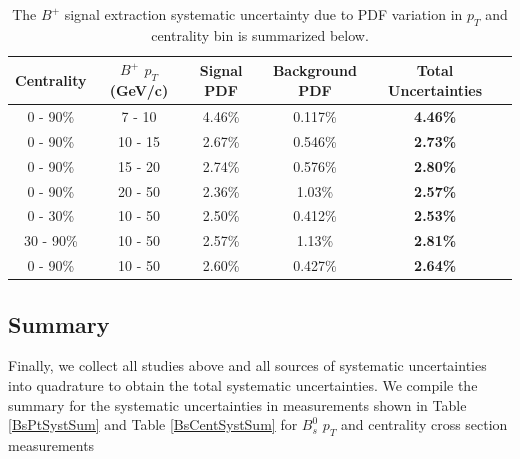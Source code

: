 \begin{table}[h]
\begin{center}
\caption{The $B^+$ signal extraction systematic uncertainty due to PDF variation in $p_T$ and centrality bin is summarized below.}
\vspace{1em}
\label{BPPDFVar}
  \begin{tabular}{| c | c |c | c| c| c| }
    \hline
     Centrality & $B^+$ $p_T$ (GeV/c) & Signal PDF & Background PDF  &  Total Uncertainties \\
    \hline
    \hline
0 - 90\% & 7 - 10 &   4.46\%  &  0.117\% & \textbf{4.46\%} \\ 
0 - 90\% & 10 - 15 & 2.67\%  & 0.546\%  & \textbf{2.73\%} \\ 
0 - 90\% & 15 - 20 &  2.74\% & 0.576\%   &  \textbf{2.80\%} \\ 
0 - 90\% & 20 - 50 &  2.36\%    & 1.03\%  &  \textbf{2.57\%} \\ 
0 - 30\% & 10 - 50  & 2.50\%  & 0.412\%  & \textbf{2.53\%}  \\ 
30 - 90\% & 10 - 50 &  2.57\% &   1.13\%  & \textbf{2.81\%} \\ 
0 - 90\% & 10 - 50 &  2.60\%   & 0.427\%  & \textbf{2.64\%} \\ 
    \hline
    \hline
\end{tabular}
\end{center}
\end{table}



\subsection{Summary}


Finally, we collect all studies above and all sources of systematic uncertainties into quadrature to obtain the total systematic uncertainties. We compile the summary for the systematic uncertainties in measurements shown in Table \ref{BsPtSystSum} and Table \ref{BsCentSystSum} for $B^0_s$ $p_T$ and centrality cross section measurements

